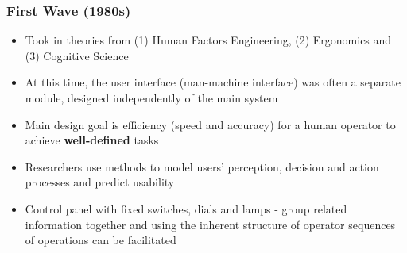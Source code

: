 \documentclass{article}
\newenvironment{example}{\par\color{brown}}{\par}
\begin{document}
\subsubsection{First Wave (1980s)}
\begin{itemize}
    \item Took in theories from (1) Human Factors Engineering, (2) Ergonomics and (3) Cognitive Science
    \item At this time, the user interface (man-machine interface) was often a separate module, designed independently of the main system
    \item Main design goal is efficiency (speed and accuracy) for a human operator to achieve \textbf{well-defined} tasks
    \item Researchers use methods to model users' perception, decision and action processes and predict usability
    
    \begin{example}
    \item Control panel with fixed switches, dials and lamps - group related information together and using the inherent structure of operator sequences of operations can be facilitated
    \end{example}
\end{itemize}
\end{document}
